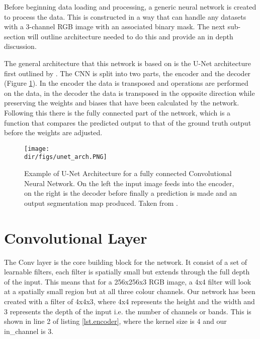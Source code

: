 Before beginning data loading and processing, a generic neural network is created to process the data. This is constructed in a way that can handle any datasets with a 3-channel RGB image with an associated binary mask. The next sub-section will outline architecture needed to do this and provide an in depth discussion. 
\par
The general architecture that this network is based on is the U-Net architecture first outlined by \citet{ronneberger15}. The CNN is split into two parts, the encoder and the decoder (Figure \ref{fig.u-net_arch}). In the encoder the data is transposed and operations are performed on the data, in the decoder the data is transposed in the opposite direction while preserving the weights and biases that have been calculated by the network. Following this there is the fully connected part of the network, which is a function that compares the predicted output to that of the ground truth output before the weights are adjusted.

\begin{figure}[htbp]
    \centering
    \texttt{[image: \\dir/figs/unet\_arch.PNG]}
    \caption[Example of U-Net Architecture for a fully connected Convolutional Neural Network]{Example of U-Net Architecture for a fully connected Convolutional Neural Network. On the left the input image feeds into the encoder, on the right is the decoder before finally a prediction is made and an output segmentation map produced. Taken from \citet{ronneberger15}.}
    \label{fig.u-net_arch}
\end{figure}

\section{Convolutional Layer}
The Conv layer is the core building block for the network. It consist of a set of learnable filters, each filter is spatially small but extends through the full depth of the input. This means that for a 256x256x3 RGB image, a 4x4 filter will look at a spatially small region but at all three colour channels. Our network has been created with a filter of 4x4x3, where 4x4 represents the height and the width and 3 represents the depth of the input i.e. the number of channels or bands. This is shown in line 2 of listing \ref{lst.encoder}, where the kernel size is 4 and our in\_channel is 3. \par


